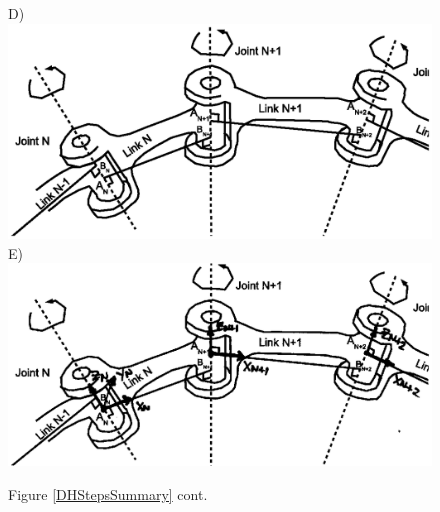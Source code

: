 \begin{figure}[p]
\centering
D)\includegraphics[width=5.0in]{figs03/linkdiag_commonnorms.eps}\\
E)\includegraphics[width=5.0in]{figs03/00336.eps}\\
\caption{Figure \ref{DHStepsSummary} cont.}\label{DHStepsSummary2}
\end{figure}


\clearpage        %




